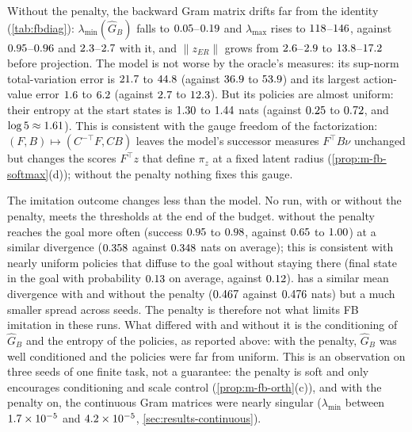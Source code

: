 Without the penalty, the backward Gram matrix drifts far from the identity (\cref{tab:fbdiag}): $\lambda_{\min}(\hat G_B)$ falls to $\vn{s13.noorth.lmin.lo}{0.05}$--$\vn{s13.noorth.lmin.hi}{0.19}$ and $\lambda_{\max}$ rises to $\vn{s13.noorth.lmax.lo}{118}$--$\vn{s13.noorth.lmax.hi}{146}$, against $\vn{s13.base.lmin.lo}{0.95}$--$\vn{s13.base.lmin.hi}{0.96}$ and $\vn{s13.base.lmax.lo}{2.3}$--$\vn{s13.base.lmax.hi}{2.7}$ with it, and $\lVert z_{ER}\rVert$ grows from $\vn{s13.base.erz.lo}{2.6}$--$\vn{s13.base.erz.hi}{2.9}$ to $\vn{s13.noorth.erz.lo}{13.8}$--$\vn{s13.noorth.erz.hi}{17.2}$ before projection.
The model is not worse by the oracle's measures: its sup-norm total-variation error is $\vn{s13.noorth.tv.lo}{21.7}$ to $\vn{s13.noorth.tv.hi}{44.8}$ (against $\vn{s13.base.tv.lo}{36.9}$ to $\vn{s13.base.tv.hi}{53.9}$) and its largest action-value error $\vn{s13.noorth.q.lo}{1.6}$ to $\vn{s13.noorth.q.hi}{6.2}$ (against $\vn{s13.base.q.lo}{2.7}$ to $\vn{s13.base.q.hi}{12.3}$).
But its policies are almost uniform: their entropy at the \DMFB{} start states is $\vn{s13.noorth.ent.lo}{1.30}$ to $\vn{s13.noorth.ent.hi}{1.44}$ nats (against $\vn{s13.base.ent.lo}{0.25}$ to $\vn{s13.base.ent.hi}{0.72}$, and $\log5\approx\vn{const.log5}{1.61}$).
This is consistent with the gauge freedom of the factorization: $(F,B)\mapsto(C^{-\top}F,CB)$ leaves the model's successor measures $F^\top B\nu$ unchanged but changes the scores $F^\top z$ that define $\pi_z$ at a fixed latent radius (\cref{prop:m-fb-softmax}(d)); without the penalty nothing fixes this gauge.

The imitation outcome changes less than the model.
No run, with or without the penalty, meets the thresholds at the end of the budget.
\ERFB{} without the penalty reaches the goal more often (success $\vn{s13.noorth.er.succ.lo}{0.95}$ to $\vn{s13.noorth.er.succ.hi}{0.98}$, against $\vn{s13.base.er.succ.lo}{0.65}$ to $\vn{s13.base.er.succ.hi}{1.00}$) at a similar divergence ($\vn{s13.noorth.er.js}{0.358}$ against $\vn{s13.base.er.js}{0.348}$ nats on average); this is consistent with nearly uniform policies that diffuse to the goal without staying there (final state in the goal with probability $\vn{s13.noorth.er.fig}{0.13}$ on average, against $\vn{s13.base.er.fig}{0.12}$).
\DMFB{} has a similar mean divergence with and without the penalty ($\vn{s13.noorth.dm.js}{0.467}$ against $\vn{s13.base.dm.js}{0.476}$ nats) but a much smaller spread across seeds.
The penalty is therefore not what limits FB imitation in these runs.
What differed with and without it is the conditioning of $\hat G_B$ and the entropy of the policies, as reported above: with the penalty, $\hat G_B$ was well conditioned and the policies were far from uniform.
This is an observation on three seeds of one finite task, not a guarantee: the penalty is soft and only encourages conditioning and scale control (\cref{prop:m-fb-orth}(c)), and with the penalty on, the continuous Gram matrices were nearly singular ($\lambda_{\min}$ between $\vn{s12.lmin.lo}{1.7\times10^{-5}}$ and $\vn{s12.lmin.hi}{4.2\times10^{-5}}$, \cref{sec:results-continuous}).
